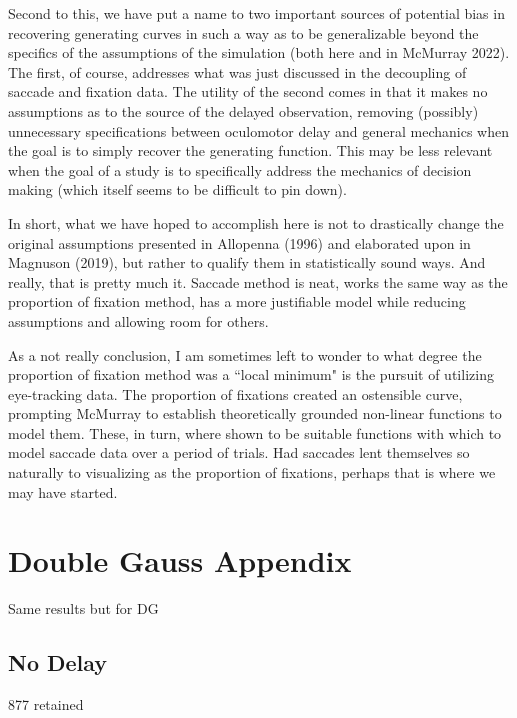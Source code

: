 \documentclass{article}
\begin{document}
Second to this, we have put a name to two important sources of potential bias in recovering generating curves in such a way as to be generalizable beyond the specifics of the assumptions of the simulation (both here and in McMurray 2022). The first, of course, addresses what was just discussed in the decoupling of saccade and fixation data. The utility of the second comes in that it makes no assumptions as to the source of the delayed observation, removing (possibly) unnecessary specifications between oculomotor delay and general mechanics when the goal is to simply recover the generating function. This may be less relevant when the goal of a study is to specifically address the mechanics of decision making (which itself seems to be difficult to pin down).

In short, what we have hoped to accomplish here is not to drastically change the original assumptions presented in Allopenna (1996) and elaborated upon in Magnuson (2019), but rather to qualify them in statistically sound ways. And really, that is pretty much it. Saccade method is neat, works the same way as the proportion of fixation method, has a more justifiable model while reducing assumptions and allowing room for others.

As a not really conclusion, I am sometimes left to wonder to what degree the proportion of fixation method was a  ``local minimum" is the pursuit of utilizing eye-tracking data. The proportion of fixations created an ostensible curve, prompting McMurray to establish theoretically grounded non-linear functions to model them. These, in turn, where shown to be suitable functions with which to model saccade data over a period of trials. Had saccades lent themselves so naturally to visualizing as the proportion of fixations, perhaps that is where we may have started.


\section*{Double Gauss Appendix}

Same results but for DG

\subsection{No Delay}

877 retained
\end{document}

